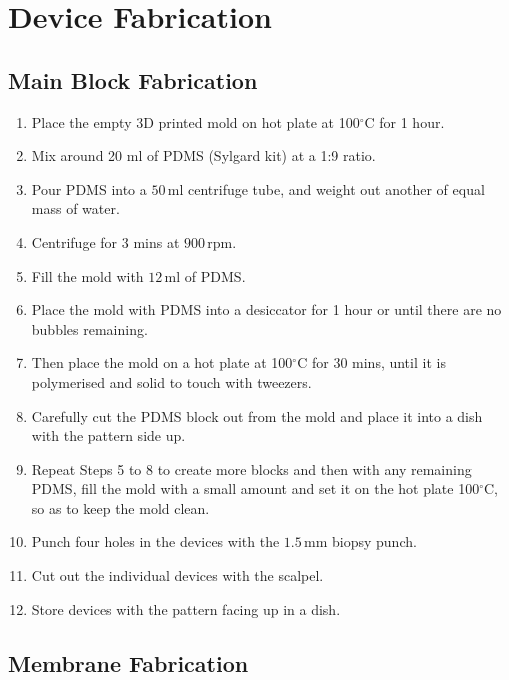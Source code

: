 \section{Device Fabrication}

\subsection{Main Block Fabrication}

\begin{enumerate}
	  \setlength\itemsep{-0.1em}
	\item Place the empty 3D printed mold on hot plate at 100$^{\circ}$C for 1 hour.
	\item Mix around 20 ml of PDMS (Sylgard kit) at a 1:9 ratio. 
	\item Pour PDMS into a $50 \, \text{ml}$ centrifuge tube, and weight out another of equal mass of water.
	\item Centrifuge for 3 mins at $900 \, \text{rpm}$. 
	\item Fill the mold with $12 \, \text{ml}$ of PDMS.
	\item Place the mold with PDMS into a desiccator for 1 hour or until there are no bubbles remaining.
	\item Then place the mold on a hot plate at 100$^{\circ}$C for 30 mins, until it is polymerised and solid to touch with tweezers. 
	\item Carefully cut the PDMS block out from the mold and place it into a dish with the pattern side up.
	\item Repeat Steps 5 to 8 to create more blocks and then with any remaining PDMS, fill the mold with a small amount and set it on the hot plate 100$^{\circ}$C, so as to keep the mold clean.
	\item Punch four holes in the devices with the $1.5 \, \text{mm}$ biopsy punch.
	\item Cut out the individual devices with the scalpel.
	\item Store devices with the pattern facing up in a dish.
\end{enumerate}

\subsection{Membrane Fabrication}

